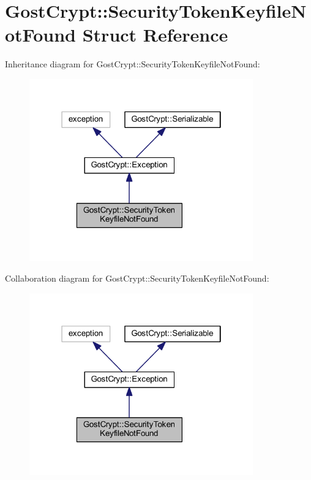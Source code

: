\hypertarget{struct_gost_crypt_1_1_security_token_keyfile_not_found}{}\section{Gost\+Crypt\+:\+:Security\+Token\+Keyfile\+Not\+Found Struct Reference}
\label{struct_gost_crypt_1_1_security_token_keyfile_not_found}


Inheritance diagram for Gost\+Crypt\+:\+:Security\+Token\+Keyfile\+Not\+Found\+:
\nopagebreak
\begin{figure}[H]
\begin{center}
\leavevmode
\includegraphics[width=274pt]{struct_gost_crypt_1_1_security_token_keyfile_not_found__inherit__graph}
\end{center}
\end{figure}


Collaboration diagram for Gost\+Crypt\+:\+:Security\+Token\+Keyfile\+Not\+Found\+:
\nopagebreak
\begin{figure}[H]
\begin{center}
\leavevmode
\includegraphics[width=274pt]{struct_gost_crypt_1_1_security_token_keyfile_not_found__coll__graph}
\end{center}
\end{figure}
